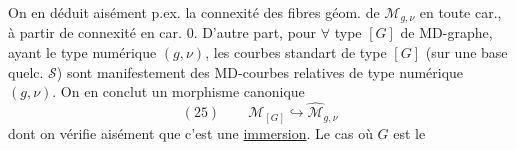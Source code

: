 
On en déduit aisément p.ex. la connexité des fibres géom. de $\mathcal M_{g,\nu}$ en toute car., à partir de  connexité en car. $0$. D'autre part, pour $\forall$ type $[G]$ de MD-graphe, ayant le type numérique $(g,\nu)$, les courbes standart de type $[G]$ (sur une base quelc. $\mathcal S$) sont manifestement des MD-courbes relatives de type numérique $(g,\nu)$. On en conclut un morphisme canonique
\[
(25)\qquad\mathcal M_{[G]}\hookrightarrow\widehat{\mathcal M}_{g,\nu}
\]
dont on vérifie aisément que c'est une \uline{immersion}. Le cas où $G$ est le
